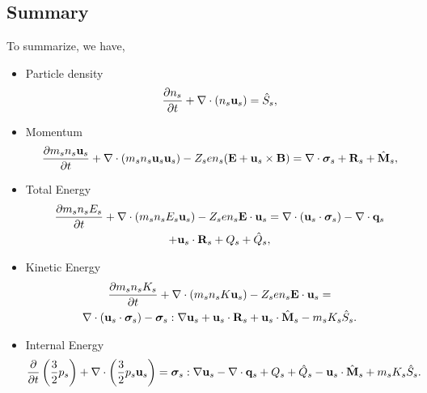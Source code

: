 \documentclass[a4paper,11pt]{report}
\begin{document}
\subsection{Summary}
\label{sec:gov_eqs_fluid_description_summary}
To summarize, we have,
\begin{itemize}
    \item Particle density
\begin{equation}
\label{eq:cons_mass}
    \frac{\partial n_s}{\partial t} + \nabla \cdot \left ( n_s \mathbf{u}_s \right ) = \hat{S}_s,
\end{equation}

    \item Momentum
\begin{equation}
\label{eq:cons_mom}
    \frac{\partial m_s n_s \mathbf{u}_s}{\partial t} + \nabla \cdot \left ( m_s n_s \mathbf{u}_s \mathbf{u}_s \right) - Z_s e n_s ( \mathbf{E} + \mathbf{u}_s \times \mathbf{B} ) = \nabla \cdot \bm \sigma_s + \mathbf{R}_s + \hat{\mathbf{M}}_s,
\end{equation}

    \item Total Energy
\begin{multline}
\label{eq:cons_te}
\frac{\partial m_s n_s E_s}{\partial t} + \nabla \cdot (m_s n_s E_s \mathbf{u}_s ) - Z_s e n_s \mathbf{E} \cdot \mathbf{u}_s = \nabla \cdot ( \mathbf{u}_s \cdot \bm \sigma_s ) - \nabla \cdot \mathbf{q}_s \\
+ \mathbf{u}_s \cdot \mathbf{R}_s + Q_{s} + \hat{Q}_s, 
\end{multline}
    
    \item Kinetic Energy
\begin{multline}
\label{eq:cons_ke}
\frac{\partial m_s n_s K_s}{\partial t} + \nabla \cdot ( m_s n_s K \mathbf{u}_s ) - Z_s e n_s \mathbf{E} \cdot \mathbf{u}_s =\\
\nabla \cdot (\mathbf{u}_s \cdot \bm \sigma_s ) - \bm \sigma_s : \nabla \mathbf{u}_s + \mathbf{u}_s \cdot \mathbf{R}_s + \mathbf{u}_s \cdot \hat{\mathbf{M}}_s - m_s K_s \hat{S}_s .
\end{multline}    
    
    \item Internal Energy
\begin{equation}
\label{eq:cons_ie}
    \frac{\partial}{\partial t} \left ( \frac{3}{2} p_s \right ) + \nabla \cdot \left ( \frac{3}{2} p_s \mathbf{u}_s \right ) = \bm \sigma_s : \nabla \mathbf{u}_s - \nabla \cdot \mathbf{q}_s + Q_{s} + \hat{Q}_s - \mathbf{u}_s \cdot \hat{\mathbf{M}}_s + m_s K_s \hat{S}_s .  
\end{equation}

\end{itemize}
\end{document}
